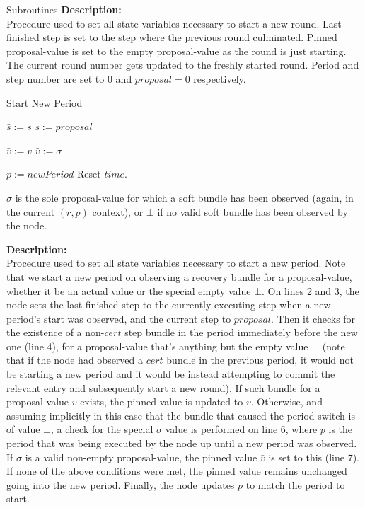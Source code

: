 \documentclass[10pt,a4paper]{article}
\begin{document}
\begin{section}{Subroutines}
\noindent \textbf{Description:}\\
Procedure used to set all state variables necessary to start a new round.
Last finished step is set to the step where the previous round culminated.
Pinned proposal-value is set to the empty proposal-value as the round is just starting.
The current round number gets updated to the freshly started round.
Period and step number are set to $0$ and $proposal=0$ respectively.


\begin{algorithm}[H]
    \caption{\underline{Start New Period}}
    \label{algo:start-new-period}
    \begin{algorithmic}[1]

    \State $\bar{s} := s$
    \State $s := proposal$

        \State $\bar{v} := v$
    \ElsIf{$\sigma \neq \bot$}
        \State $\bar{v} := \sigma$
    \EndIf

    \State $p := newPeriod$
    \State Reset $time$.
    \EndFunction
    \end{algorithmic}
\end{algorithm}

$\sigma$ is the sole proposal-value for which a soft bundle has been observed (again, 
in the current $(r,p)$ context), or $\bot$ if no valid soft bundle has been observed by the 
node.

\noindent \textbf{Description:}\\
Procedure used to set all state variables necessary to start a new period.
Note that we start a new period on observing a recovery bundle for a proposal-value, whether it be
an actual value or the special empty value $\bot$.
On lines 2 and 3, the node sets the last finished step to the currently executing step when a new period's
start was observed, and the current step to $proposal$.
Then it checks for the existence of a non-$cert$ step bundle in the period immediately before the new one (line 4), 
for a proposal-value that's anything but the empty value $\bot$ (note that if the node had observed a $cert$
bundle in the previous period, it would not be starting a new period and it would be instead attempting to commit
the relevant entry and subsequently start a new round). If such bundle for a proposal-value $v$ exists, the pinned 
value is updated to $v$.
Otherwise, and assuming implicitly in this case that the bundle that caused the period switch is of value $\bot$,
a check for the special $\sigma$ value is performed on line 6, where $p$ is the period that was being executed 
by the node up until a new period was observed. If $\sigma$ is a valid non-empty proposal-value, the pinned 
value $\bar{v}$ is set to this (line 7).
If none of the above conditions were met, the pinned value remains unchanged going into the new period.
Finally, the node updates $p$ to match the period to start.


\end{section}
\end{document}

